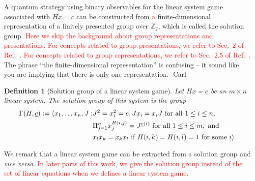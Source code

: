 \documentclass[11pt,letterpaper]{article}
\DeclarePairedDelimiter{\ip}{\langle}{\rangle}
\newcommand{\Z}{\mathbb{Z}}
\newcommand{\calH}{\mathcal{H}}
\newcommand{\1}{\mathbb{1}}
\newcommand{\ux}{\underline{x}}
\newcommand{\uc}{\underline{c}}
\def\carl#1{{\color{blue} #1 -Carl}}
\newcommand{\hf}[1]{\textcolor{red}{#1}}
\newtheorem{definition}[theorem]{Definition}
\theoremstyle{definition}
\begin{document}
A quantum strategy using binary observables for the linear system game associated with $H\ux = \uc$ can be constructed from
\hf{a} finite-dimensional representation of a finitely presented group
over $\Z_2$, which is called the solution group.  
\hf{Here we skip the background about group representations and presentations.
For concepts related to group presentations, we refer to Sec.~$2$ of Ref.~\cite{slofstra2017}.
For concepts related to group representations, we refer to Sec.~$2.5$ of Ref.~\cite{coladan2017}. }
\carl{The phrase ``the finite-dimensional
representation'' is confusing -- it sound like you are implying that there is only one representation.}
\begin{definition}[Solution group of a linear system game]
	\label{def:presentation}
	Let $H\ux = \uc$ be an $m \times n$  linear system. The solution group of this system
	is the group
	\begin{align*}
		\Gamma(H,\uc) := \ip{
		x_1,\dots x_n, J: &J^2 = x_i^2 = e, Jx_i = x_iJ \text{ for all }1 \leq i \leq n, \\
				& \Pi_{j=1}^n x_j^{H(i,j)} = J^{\uc(i)} \text{ for all } 1 \leq i \leq m, \text{ and } \\
				& x_l x_k = x_k x_l \text{ if } H(i,k) = H(i,l) = 1 \text{ for some } i
				} .
	\end{align*}
\end{definition}
We remark that a linear system game can be extracted from a solution group and \textit{vice versa}.
\hf{In later parts of this work, we give the solution group instead of the set of linear equations when we defines
a linear system game.} 
\end{document}
